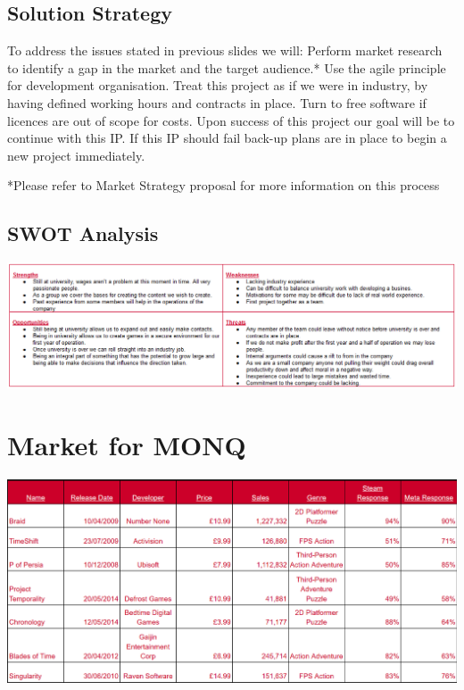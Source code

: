 \documentclass{scrartcl}
\begin{document}
\subsection{Solution Strategy }
To address the issues stated in previous slides we will:
Perform market research to identify a gap in the market and the target audience.*
Use the agile principle for development organisation.
Treat this project as if we were in industry, by having defined working hours and contracts in place.
Turn to free software if licences are out of scope for costs.
Upon success of this project our goal will be to continue with this IP.
If this IP should fail back-up plans are in place to begin a new project immediately.

*Please refer to Market Strategy proposal for more information on this process

\subsection{SWOT Analysis}
\begin{center}
	\includegraphics[scale=.5]{SWOT}	
	\newline
\end{center}


\section{Market for MONQ}
\begin{center}
	\includegraphics[scale=0.4]{ResearchChart}	
	\newline
\end{center}
\end{document}
